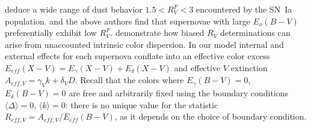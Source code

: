 \documentclass{aastex61}   	%
\begin{document}
\color{black}

\citet{2014ApJ...789...32B, 2015MNRAS.453.3300A} deduce a wide range of dust behavior $1.5<R^F_V<3$ encountered by the SN~Ia population.
\citet{2011ApJ...731..120M, 2011ApJ...729...55F} and the above authors
find that supernovae with large $E_o(B-V)$ 
preferentially exhibit low $R^F_V$. 
\color{red}
\citet{2016arXiv160904470M} demonstrate how biased $R_V$ determinations can arise from unaccounted intrinsic color dispersion.
In our model internal and external effects for each supernova  conflate into an effective color excess
$E_{eff}(X-V) = E_\gamma(X-V) + E_\delta(X-V)$ and effective $V$ extinction $A_{eff,V} = \gamma_V k  + \delta_V D$.
Recall that the colors where $E_\gamma(B-V)=0$,  $E_\delta(B-V)=0$ are free and arbitrarily
fixed using the  boundary conditions $\langle \Delta \rangle = 0$, $\langle k \rangle = 0$:
there is no unique value for the statistic $R_{eff,V} = A_{eff,V} /E_{eff}(B-V)$, as it depends on the choice of  boundary condition.
\end{document}
